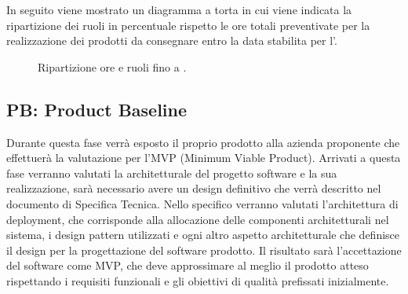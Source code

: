 In seguito viene mostrato un diagramma a torta in cui viene indicata la ripartizione dei ruoli in percentuale rispetto le ore totali preventivate per la realizzazione dei prodotti da consegnare entro la data stabilita per l'.

\begin{figure}[H]
    \centering
    \caption{Ripartizione ore e ruoli fino a .}
    \label{fig:pie_ruoli_RTB}
\end{figure}

\subsection{PB: Product Baseline}
Durante questa fase verrà esposto il proprio prodotto alla azienda proponente che effettuerà la valutazione per l'MVP (Minimum Viable Product).
Arrivati a questa fase verranno valutati la  architetturale del progetto software e la sua realizzazione, sarà necessario avere un design definitivo 
che verrà descritto nel documento di Specifica Tecnica.
Nello specifico verranno valutati l'architettura di deployment, che corrisponde alla allocazione delle componenti architetturali nel sistema, 
i design pattern utilizzati e ogni altro aspetto architetturale che definisce il design per la progettazione del software prodotto.
Il risultato sarà l'accettazione del software come MVP, che deve approssimare al meglio il prodotto atteso rispettando i requisiti funzionali 
e gli obiettivi di qualità prefissati inizialmente.